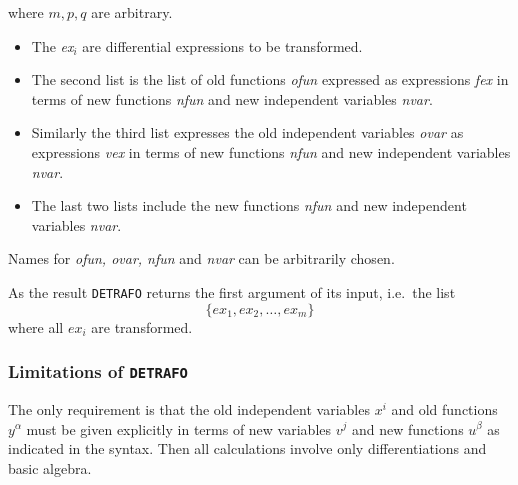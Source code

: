 where $m,p,q$ are arbitrary.
\begin{itemize}
\item
The \textit{ex}$_i$ are differential expressions to be transformed.
\item
The second list is the list of old functions \textit{ofun} expressed
as expressions \textit{fex} in terms
of new functions \textit{nfun} and new independent variables \textit{nvar}.
\item
Similarly the third list expresses the old independent variables \textit{ovar}
as expressions \textit{vex} in terms of new functions
\textit{nfun} and new independent variables \textit{nvar}.
\item
The last two lists include the new functions \textit{nfun}
and new independent variables \textit{nvar}.
\end{itemize}
Names for \textit{ofun, ovar, nfun} and \textit{nvar} can be arbitrarily
chosen.

As the result \texttt{DETRAFO} returns the first argument of its input,
i.e.\ the list
\[\{\textit{ex}_1, \textit{ex}_2, \ldots , \textit{ex}_m\}\]
where all $\textit{ex}_i$ are transformed.
\subsubsection{Limitations of \texttt{DETRAFO}}
The only requirement is that
the old independent variables $x^i$ and old functions $y^\alpha$ must be
given explicitly in terms of new variables $v^j$ and new functions $u^\beta$
as indicated in the syntax.
Then all calculations involve only differentiations and basic algebra.
